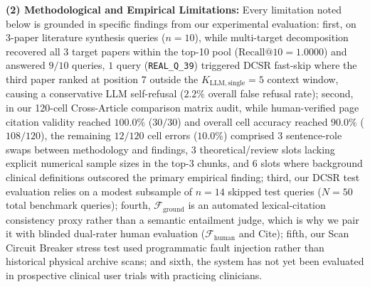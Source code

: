 \documentclass[10pt]{SPIIRAS_Proceedings}
\begin{document}
\textbf{(2) Methodological and Empirical Limitations:} Every limitation noted below is grounded in specific findings from our experimental evaluation: first, on 3-paper literature synthesis queries ($n = 10$), while multi-target decomposition recovered all $3$ target papers within the top-10 pool ($\mathrm{Recall@10} = 1.0000$) and answered $9/10$ queries, $1$ query (\texttt{REAL\_Q\_39}) triggered DCSR fast-skip where the third paper ranked at position 7 outside the $K_{\mathrm{LLM, single}} = 5$ context window, causing a conservative LLM self-refusal ($2.2\%$ overall false refusal rate); second, in our 120-cell Cross-Article comparison matrix audit, while human-verified page citation validity reached $100.0\%$ ($30/30$) and overall cell accuracy reached $90.0\%$ ($108/120$), the remaining $12/120$ cell errors ($10.0\%$) comprised $3$ sentence-role swaps between methodology and findings, $3$ theoretical/review slots lacking explicit numerical sample sizes in the top-3 chunks, and $6$ slots where background clinical definitions outscored the primary empirical finding; third, our DCSR test evaluation relies on a modest subsample of $n = 14$ skipped test queries ($N = 50$ total benchmark queries); fourth, $\mathcal{F}_{\mathrm{ground}}$ is an automated lexical-citation consistency proxy rather than a semantic entailment judge, which is why we pair it with blinded dual-rater human evaluation ($\mathcal{F}_{\mathrm{human}}$ and $\mathrm{Cite}$); fifth, our Scan Circuit Breaker stress test used programmatic fault injection rather than historical physical archive scans; and sixth, the system has not yet been evaluated in prospective clinical user trials with practicing clinicians.
\end{document}
